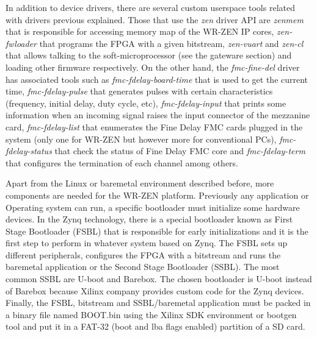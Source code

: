 In addition to device drivers, there are several custom userspace tools related with drivers previous explained. Those that use the \textit{zen} driver API are \textit{zenmem} that is responsible for accessing memory map of the WR-ZEN IP cores, \textit{zen-fwloader} that programs the FPGA with a given bitstream, \textit{zen-vuart} and \textit{zen-cl} that allows talking to the soft-microprocessor (see the gateware section) and loading other firmware respectively. On the other hand, the  \textit{fmc-fine-del} driver has associated tools such as \textit{fmc-fdelay-board-time} that is used to get the current time, \textit{fmc-fdelay-pulse} that generates pulses with certain characteristics (frequency, initial delay, duty cycle, etc), \textit{fmc-fdelay-input} that prints some information when an incoming signal raises the input connector of the mezzanine card, \textit{fmc-fdelay-list} that enumerates the Fine Delay FMC cards plugged in the system (only one for WR-ZEN but however more for conventional PCs), \textit{fmc-fdelay-status} that check the status of Fine Delay FMC core and \textit{fmc-fdelay-term} that configures the termination of each channel among others.

Apart from the Linux or baremetal environment described before, more components are needed  for the WR-ZEN platform. Previously any application or Operating system can run, a specific bootloader must initialize some hardware devices. In the Zynq technology, there is a special bootloader known as First Stage Bootloader (FSBL) that is responsible for early initializations and it is the first step to perform in whatever system based on Zynq. The FSBL sets up different peripherals, configures the FPGA with a bitstream and runs the baremetal application or the Second Stage Bootloader (SSBL). The most common SSBL are U-boot and Barebox. The chosen bootloader is U-boot instead of Barebox because Xilinx company provides custom code for the Zynq devices. Finally, the FSBL, bitstream and SSBL/baremetal application must be packed in a binary file named BOOT.bin using the Xilinx SDK environment or bootgen tool and put it in a FAT-32 (boot and lba flags enabled) partition of a SD card.

